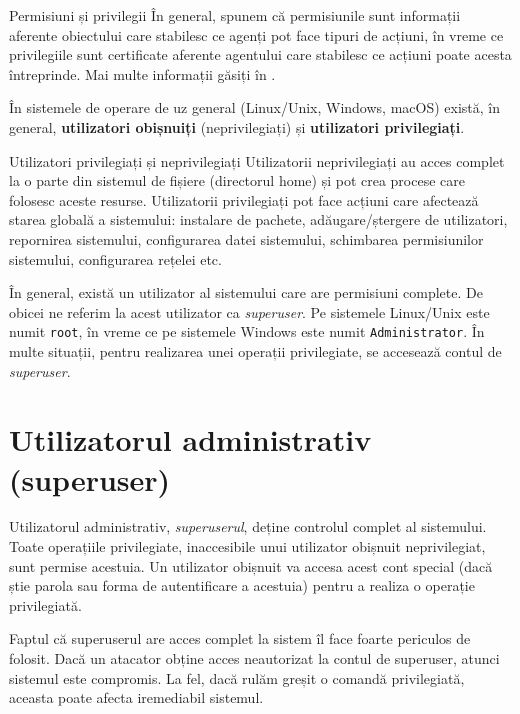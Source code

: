 \begin{definition}{Permisiuni și privilegii}
  În general, spunem că permisiunile sunt informații aferente obiectului care stabilesc ce agenți pot face tipuri de acțiuni, în vreme ce privilegiile sunt certificate aferente agentului care stabilesc ce acțiuni poate acesta întreprinde.
  Mai multe informații găsiți în .
\end{definition}

În sistemele de operare de uz general (Linux/Unix, Windows, macOS) există, în general, \textbf{utilizatori obișnuiți} (neprivilegiați) și \textbf{utilizatori privilegiați}.

\begin{definition}{Utilizatori privilegiați și neprivilegiați}
  Utilizatorii neprivilegiați au acces complet la o parte din sistemul de fișiere (directorul home) și pot crea procese care folosesc aceste resurse.
  Utilizatorii privilegiați pot face acțiuni care afectează starea globală a sistemului: instalare de pachete, adăugare/ștergere de utilizatori, repornirea sistemului, configurarea datei sistemului, schimbarea permisiunilor sistemului, configurarea rețelei etc.
\end{definition}

În general, există un utilizator al sistemului care are permisiuni complete.
De obicei ne referim la acest utilizator ca \textit{superuser}.
Pe sistemele Linux/Unix este numit \texttt{root}, în vreme ce pe sistemele Windows este numit \texttt{Administrator}.
În multe situații, pentru realizarea unei operații privilegiate, se accesează contul de \textit{superuser}.

\section{Utilizatorul administrativ (superuser)}
\label{sec:user:superuser}

Utilizatorul administrativ, \textit{superuserul}, deține controlul complet al sistemului.
Toate operațiile privilegiate, inaccesibile unui utilizator obișnuit neprivilegiat, sunt permise acestuia.
Un utilizator obișnuit va accesa acest cont special (dacă știe parola sau forma de autentificare a acestuia) pentru a realiza o operație privilegiată.

Faptul că superuserul are acces complet la sistem îl face foarte periculos de folosit.
Dacă un atacator obține acces neautorizat la contul de superuser, atunci sistemul este compromis.
La fel, dacă rulăm greșit o comandă privilegiată, aceasta poate afecta iremediabil sistemul.


